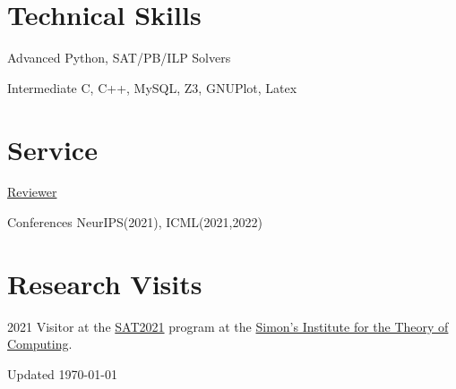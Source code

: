 \documentclass[12pt,letterpaper]{report}
\begin{document}
	\section*{Technical Skills}
	\begin{tablist}
		\item[Advanced] \tab Python, SAT/PB/ILP Solvers
		\item[Intermediate] \tab C, C++, MySQL, Z3, GNUPlot, Latex
	\end{tablist}
	
	
	\section*{Service}
	\underline{Reviewer }
	\begin{tablist}
		\item[Conferences] \tab NeurIPS(2021), ICML(2021,2022) 
	\end{tablist}
	
	\section*{Research Visits}
		\begin{tablist}
	\item[2021]
 Visitor at the \href{https://simons.berkeley.edu/programs/sat2021}{SAT2021} program at the \href{https://simons.berkeley.edu/}{Simon's Institute for the Theory of Computing}.
	\end{tablist}
	
    \begin{center}
        \vfill
        Updated \monthyeardate\today
    \end{center}
\end{document}
